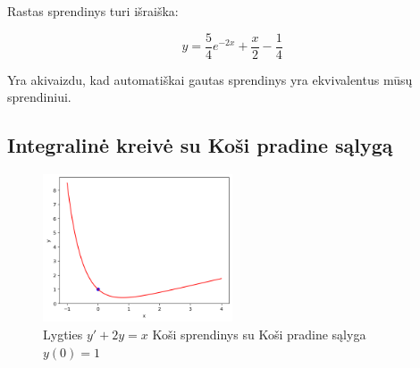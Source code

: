 \documentclass[11pt]{article}
\begin{document}
Rastas sprendinys turi išraiška:

\begin{equation}
y=\frac{5}{4}e^{-2x}+\frac{x}{2}-\frac{1}{4}
\end{equation}

Yra akivaizdu, kad automatiškai gautas sprendinys yra ekvivalentus mūsų sprendiniui.

\subsection*{Integralinė kreivė su Koši pradine sąlygą}

\begin{figure}[h!]
    \centering
    \includegraphics[width=0.5\textwidth]{3-updated.png}
    \caption{Lygties $y'+2y=x$ Koši sprendinys su Koši pradine sąlyga $y(0)=1$}
    \label{fig:pvz3}
\end{figure}
\end{document}
